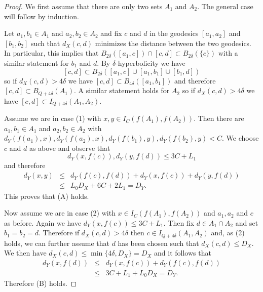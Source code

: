 \documentclass[11pt]{article}
\theoremstyle{remark}
\begin{document}
\begin{proof}
We first assume that there are only two sets $A_1$ and $A_2$. The general case will follow by induction.

Let $a_1, b_1 \in A_1$ and $a_2, b_2 \in A_2$ and fix $c$ and $d$ in the geodesics $[a_1, a_2]$ and $[b_1,b_2]$ such that $d_X(c,d)$ minimizes the distance between the two geodesics. In particular, this implies that $B_{2\delta}([a_1, c]) \cap [c,d] \subset B_{2\delta}(\{c\})$ with a similar statement for $b_1$ and $d$. By $\delta$-hyperbolicity we have 
$$[c,d] \subset B_{2\delta}([a_1, c] \cup [a_1, b_1] \cup [b_1, d])$$
so if $d_X(c,d) > 4\delta$ we have $[c,d] \subset B_{4\delta}([a_1,b_1])$ and therefore $[c,d] \subset B_{Q+4\delta}(A_1)$. A similar statement holds for $A_2$ so if $d_X(c,d) > 4\delta$ we have $[c,d] \subset I_{Q+4\delta}(A_1, A_2)$. 

Assume we are in case (1) with $x,y \in I_C(f(A_1), f(A_2))$. Then there are $a_1, b_1 \in A_1$ and $a_2, b_2 \in A_2$ with $d_Y(f(a_1), x), d_Y(f(a_2), x), d_Y(f(b_1), y), d_Y(f(b_2), y) < C$. We choose $c$ and $d$ as above
and observe that
$$d_Y(x, f(c)), d_Y(y, f(d)) \le 3C+L_1$$
and therefore
\begin{eqnarray*}
d_Y(x,y) &\le &  d_Y(f(c), f(d)) + d_Y(x, f(c)) + d_Y(y, f(d))\\ & \le & L_0 D_X + 6C + 2L_1 = D_Y.
\end{eqnarray*}
This proves that (A) holds.

Now assume we are in case (2) with $x \in I_C(f(A_1), f(A_2))$ and $a_1,a_2$ and $c$ as before. Again we have $d_Y(x, f(c)) \le 3C+L_1$. Then fix $d \in A_1\cap A_2$ and set $b_1 = b_2 = d$. Therefore if $d_X(c,d) > 4\delta$ then $c \in I_{Q+ 4\delta}(A_1, A_2)$ and, as (2) holds, we can further assume that $d$ has been chosen such that $d_X(c,d) \le D_X$. We then have $d_X(c,d) \le \min\{ 4\delta, D_X\} = D_X$ and it follows that
\begin{eqnarray*}
d_Y(x, f(d)) & \le & d_Y(x, f(c)) + d_Y(f(c), f(d)) \\ & \le & 3C+ L_1 + L_0 D_X = D_Y.
\end{eqnarray*}
Therefore (B) holds.


\end{proof}
\end{document}
